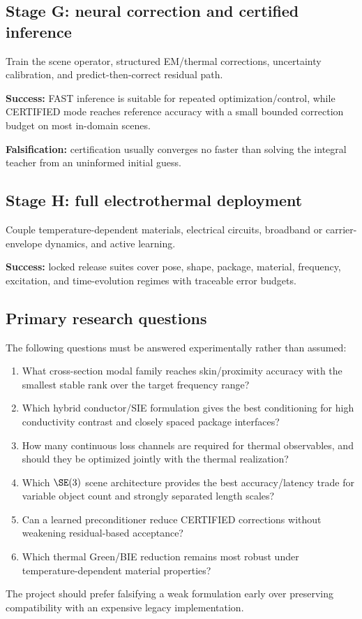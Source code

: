\subsection{Stage G: neural correction and certified inference}

Train the scene operator, structured EM/thermal corrections, uncertainty
calibration, and predict-then-correct residual path.

\textbf{Success:} FAST inference is suitable for repeated optimization/control,
while CERTIFIED mode reaches reference accuracy with a small bounded correction
budget on most in-domain scenes.

\textbf{Falsification:} certification usually converges no faster than solving
the integral teacher from an uninformed initial guess.

\subsection{Stage H: full electrothermal deployment}

Couple temperature-dependent materials, electrical circuits, broadband or
carrier-envelope dynamics, and active learning.

\textbf{Success:} locked release suites cover pose, shape, package, material,
frequency, excitation, and time-evolution regimes with traceable error budgets.

\subsection{Primary research questions}

The following questions must be answered experimentally rather than assumed:
\begin{enumerate}
\item What cross-section modal family reaches skin/proximity accuracy with the
      smallest stable rank over the target frequency range?
\item Which hybrid conductor/SIE formulation gives the best conditioning for
      high conductivity contrast and closely spaced package interfaces?
\item How many continuous loss channels are required for thermal observables,
      and should they be optimized jointly with the thermal realization?
\item Which $\SE(3)$ scene architecture provides the best accuracy/latency trade
      for variable object count and strongly separated length scales?
\item Can a learned preconditioner reduce CERTIFIED corrections without
      weakening residual-based acceptance?
\item Which thermal Green/BIE reduction remains most robust under
      temperature-dependent material properties?
\end{enumerate}

The project should prefer falsifying a weak formulation early over preserving
compatibility with an expensive legacy implementation.
